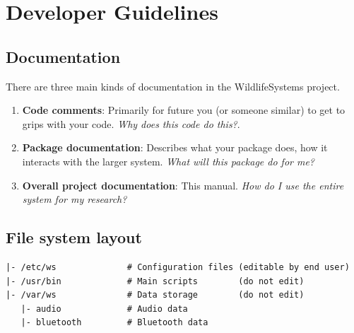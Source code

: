 \documentclass[
]{book}
\newenvironment{Shaded}{\begin{snugshade}}{\end{snugshade}}
\newcommand{\CommentTok}[1]{\textcolor[rgb]{0.56,0.35,0.01}{\textit{#1}}}
\newcommand{\ControlFlowTok}[1]{\textcolor[rgb]{0.13,0.29,0.53}{\textbf{#1}}}
\newcommand{\DecValTok}[1]{\textcolor[rgb]{0.00,0.00,0.81}{#1}}
\newcommand{\ExtensionTok}[1]{#1}
\newcommand{\FunctionTok}[1]{\textcolor[rgb]{0.13,0.29,0.53}{\textbf{#1}}}
\newcommand{\KeywordTok}[1]{\textcolor[rgb]{0.13,0.29,0.53}{\textbf{#1}}}
\newcommand{\NormalTok}[1]{#1}
\newcommand{\OperatorTok}[1]{\textcolor[rgb]{0.81,0.36,0.00}{\textbf{#1}}}
\newcommand{\StringTok}[1]{\textcolor[rgb]{0.31,0.60,0.02}{#1}}
\newcommand{\VariableTok}[1]{\textcolor[rgb]{0.00,0.00,0.00}{#1}}
\begin{document}
\begin{Shaded}
\end{Shaded}

\chapter{Developer Guidelines}\label{developer-guidelines}

\section{Documentation}\label{documentation}

There are three main kinds of documentation in the WildlifeSystems project.

\begin{enumerate}
\def\labelenumi{\arabic{enumi}.}
\item
  \textbf{Code comments}: Primarily for future you (or someone similar) to get to grips with your code. \emph{Why does this code do this?}.
\item
  \textbf{Package documentation}: Describes what your package does, how it interacts with the larger system. \emph{What will this package do for me?}
\item
  \textbf{Overall project documentation}: This manual. \emph{How do I use the entire system for my research?}
\end{enumerate}

\section{File system layout}\label{file-system-layout}

\begin{verbatim}
|- /etc/ws              # Configuration files (editable by end user)
|- /usr/bin             # Main scripts        (do not edit)
|- /var/ws              # Data storage        (do not edit)
   |- audio             # Audio data
   |- bluetooth         # Bluetooth data
\end{verbatim}
\end{document}
